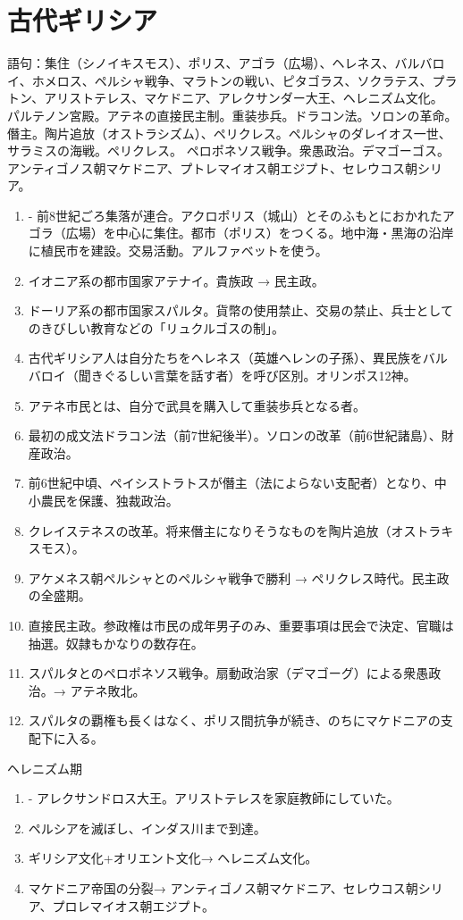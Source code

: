 \documentclass[twocolumn,autodetect-engine,dvipdfmx-if-dvi,ja=standard]{jsarticle} \usepackage{mystyle}
\begin{document}
\section{古代ギリシア}

語句：集住（シノイキスモス）、ポリス、アゴラ（広場）、ヘレネス、バルバロイ、ホメロス、ペルシャ戦争、マラトンの戦い、ピタゴラス、ソクラテス、プラトン、アリストテレス、マケドニア、アレクサンダー大王、ヘレニズム文化。
パルテノン宮殿。アテネの直接民主制。重装歩兵。ドラコン法。ソロンの革命。僭主。陶片追放（オストラシズム）、ペリクレス。ペルシャのダレイオス一世、サラミスの海戦。ペリクレス。
ペロポネソス戦争。衆愚政治。デマゴーゴス。
アンティゴノス朝マケドニア、プトレマイオス朝エジプト、セレウコス朝シリア。


\begin{enumerate}
\item - 前8世紀ごろ集落が連合。アクロポリス（城山）とそのふもとにおかれたアゴラ（広場）を中心に集住。都市（ポリス）をつくる。地中海・黒海の沿岸に植民市を建設。交易活動。アルファベットを使う。
\item イオニア系の都市国家アテナイ。貴族政 → 民主政。
\item ドーリア系の都市国家スパルタ。貨幣の使用禁止、交易の禁止、兵士としてのきびしい教育などの「リュクルゴスの制」。
\item 古代ギリシア人は自分たちをヘレネス（英雄ヘレンの子孫）、異民族をバルバロイ（聞きぐるしい言葉を話す者）を呼び区別。オリンポス12神。
\item   アテネ市民とは、自分で武具を購入して重装歩兵となる者。
\item 最初の成文法ドラコン法（前7世紀後半）。ソロンの改革（前6世紀諸島）、財産政治。
\item 前6世紀中頃、ペイシストラトスが僭主（法によらない支配者）となり、中小農民を保護、独裁政治。
\item クレイステネスの改革。将来僭主になりそうなものを陶片追放（オストラキスモス）。
\item アケメネス朝ペルシャとのペルシャ戦争で勝利 → ペリクレス時代。民主政の全盛期。
\item 直接民主政。参政権は市民の成年男子のみ、重要事項は民会で決定、官職は抽選。奴隷もかなりの数存在。
\item スパルタとのペロポネソス戦争。扇動政治家（デマゴーグ）による衆愚政治。→ アテネ敗北。
\item スパルタの覇権も長くはなく、ポリス間抗争が続き、のちにマケドニアの支配下に入る。
\end{enumerate}
ヘレニズム期
\begin{enumerate}
\item - アレクサンドロス大王。アリストテレスを家庭教師にしていた。
\item ペルシアを滅ぼし、インダス川まで到達。
\item ギリシア文化+オリエント文化→ ヘレニズム文化。
\item マケドニア帝国の分裂→ アンティゴノス朝マケドニア、セレウコス朝シリア、プロレマイオス朝エジプト。

\end{enumerate}
\end{document}
